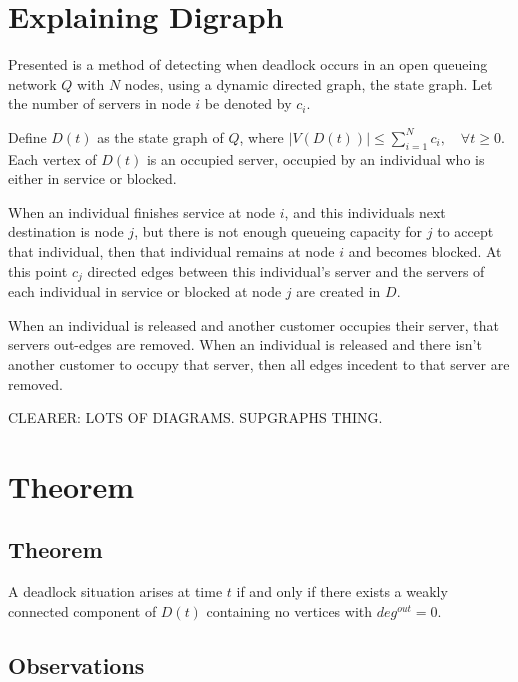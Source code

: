 \documentclass{article}
\begin{document}
\section{Explaining Digraph}

Presented is a method of detecting when deadlock occurs in an open queueing network $Q$ with $N$ nodes, using a dynamic directed graph, the state graph.
Let the number of servers in node $i$ be denoted by $c_i$.\newline

Define $D(t)$ as the state graph of $Q$, where $\left| V\left(D\left(t\right)\right) \right| \leq \sum_{i=1}^N c_i, \quad \forall t \geq 0$. Each vertex of $D(t)$ is an occupied server, occupied by an individual who is either in service or blocked.\newline

When an individual finishes service at node $i$, and this individuals next destination is node $j$, but there is not enough queueing capacity for $j$ to accept that individual, then that individual remains at node $i$ and becomes blocked.
At this point $c_j$ directed edges between this individual's server and the servers of each individual in service or blocked at node $j$ are created in $D$.\newline

When an individual is released and another customer occupies their server, that servers out-edges are removed.
When an individual is released and there isn't another customer to occupy that server, then all edges incedent to that server are removed.\newline

CLEARER: LOTS OF DIAGRAMS. SUPGRAPHS THING.



\section{Theorem}

\subsection*{Theorem}

A deadlock situation arises at time $t$ if and only if there exists a weakly connected component of $D(t)$ containing no vertices with $deg^{out} = 0$.\newline

\subsection*{Observations}
\end{document}

